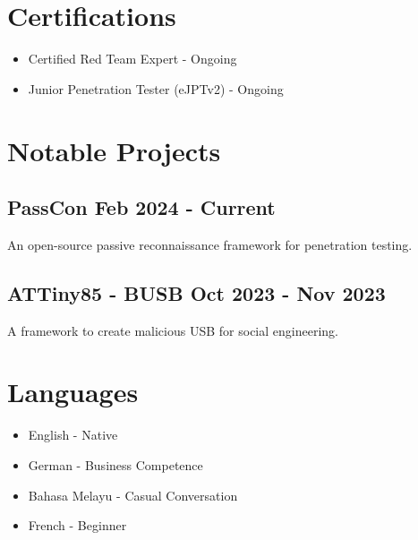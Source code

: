 \documentclass[a4paper,10pt]{article}
\begin{document}
	\section*{ Certifications}
	\begin{itemize}[label=]
		\item Certified Red Team Expert - Ongoing
		\item Junior Penetration Tester (eJPTv2) - Ongoing
	\end{itemize}
	
	\section*{ Notable Projects}
	\subsection*{PassCon \hfill Feb 2024 - Current}
	An open-source passive reconnaissance framework for penetration testing.
	
	\subsection*{ATTiny85 - BUSB  \hfill Oct 2023 - Nov 2023}
	A framework to create malicious USB for social engineering.
	
	\section*{ Languages}
	\begin{itemize}[label=]
		\item English - Native
		\item German - Business Competence
		\item Bahasa Melayu - Casual Conversation
		\item French - Beginner
	\end{itemize}
\end{document}
